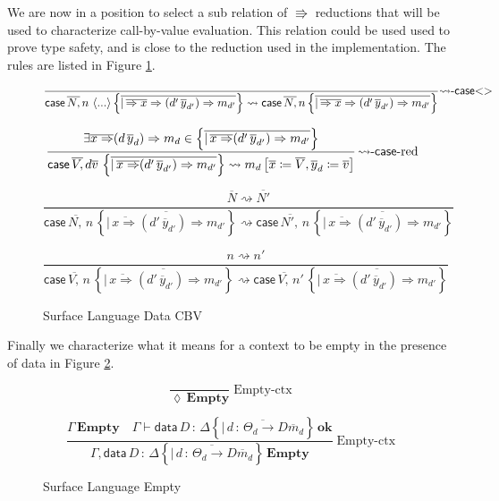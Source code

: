 We are now in a position to select a sub relation of $\Rrightarrow$
reductions that will be used to characterize call-by-value evaluation.
This relation could be used used to prove type safety, and is close
to the reduction used in the implementation. The rules are listed
in Figure \ref{fig:surface-data-cbv}.

\begin{figure}
\[
\frac{\,}{\mathsf{case}\,\overline{N,}\,n\,\left\langle ...\right\rangle \left\{ \overline{|\,\overline{\Rightarrow x}\Rightarrow(d'\,\overline{y}_{d'})\Rightarrow m_{d'}}\right\} \rightsquigarrow\mathsf{case}\,\overline{N,}\,n\left\{ \overline{|\,\overline{\Rightarrow x}\Rightarrow(d'\,\overline{y}_{d'})\Rightarrow m_{d'}}\right\} }\textrm{\ensuremath{\rightsquigarrow}-\ensuremath{\mathsf{case}}<>}
\]

\[
\frac{\exists\overline{x\Rightarrow}(d\,\overline{y}_{d})\Rightarrow m_{d}\in\left\{ \overline{|\,\overline{x\Rightarrow}(d'\,\overline{y}_{d'})\Rightarrow m_{d'}}\right\} }{\mathsf{case}\,\overline{V,}\,d\overline{v}\,\left\{ \overline{|\,\overline{x\Rightarrow}(d'\,\overline{y}_{d'})\Rightarrow m_{d'}}\right\} \rightsquigarrow m_{d}\left[\overline{x}\coloneqq\overline{V},\overline{y}_{d}\coloneqq\overline{v}\right]}\,\textrm{\ensuremath{\rightsquigarrow}-\ensuremath{\mathsf{case}}-red}
\]

\[
\frac{\overline{N}\rightsquigarrow\overline{N'}}{\mathsf{case}\,\overline{N,}\,n\,\left\{ \overline{|\,\overline{x\Rightarrow}(d'\,\overline{y}_{d'})\Rightarrow m_{d'}}\right\} \rightsquigarrow\mathsf{case}\,\overline{N',}\,n\,\left\{ \overline{|\,\overline{x\Rightarrow}(d'\,\overline{y}_{d'})\Rightarrow m_{d'}}\right\} }\,
\]

\[
\frac{n\rightsquigarrow n'}{\mathsf{case}\,\overline{V,}\,n\,\left\{ \overline{|\,\overline{x\Rightarrow}(d'\,\overline{y}_{d'})\Rightarrow m_{d'}}\right\} \rightsquigarrow\mathsf{case}\,\overline{V,}\,n'\,\left\{ \overline{|\,\overline{x\Rightarrow}(d'\,\overline{y}_{d'})\Rightarrow m_{d'}}\right\} }\,
\]

\caption{Surface Language Data CBV}
\label{fig:surface-data-cbv}
\end{figure}


Finally we characterize what it means for a context to be empty in
the presence of data in Figure \ref{fig:surface-data-empty}.

\begin{figure}
\[
\frac{\ }{\lozenge\,\mathbf{Empty}}\operatorname{Empty-ctx}
\]

\[
\frac{\Gamma\,\mathbf{Empty}\quad\Gamma\vdash\mathsf{data}\,D\,:\,\Delta\left\{ \overline{|\,d\,:\,\varTheta_{d}\rightarrow D\overline{m}_{d}}\right\} \,\mathbf{ok}}{\Gamma,\mathsf{data}\,D\,:\,\Delta\left\{ \overline{|\,d\,:\,\varTheta_{d}\rightarrow D\overline{m}_{d}}\right\} \,\mathbf{Empty}}\operatorname{Empty-ctx}
\]

\caption{Surface Language Empty}
\label{fig:surface-data-empty}
\end{figure}

